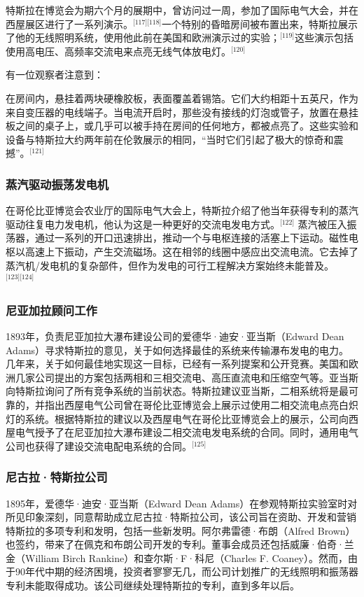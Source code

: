 特斯拉在博览会为期六个月的展期中，曾访问过一周，参加了国际电气大会，并在西屋展区进行了一系列演示。\(^\text{[117][118]}\)一个特别的昏暗房间被布置出来，特斯拉展示了他的无线照明系统，使用他此前在美国和欧洲演示过的实验；\(^\text{[119]}\)这些演示包括使用高电压、高频率交流电来点亮无线气体放电灯。\(^\text{[120]}\)

有一位观察者注意到：

在房间内，悬挂着两块硬橡胶板，表面覆盖着锡箔。它们大约相距十五英尺，作为来自变压器的电线端子。当电流开启时，那些没有接线的灯泡或管子，放置在悬挂板之间的桌子上，或几乎可以被手持在房间的任何地方，都被点亮了。这些实验和设备与特斯拉大约两年前在伦敦展示的相同，“当时它们引起了极大的惊奇和震撼”。\(^\text{[121]}\)
\subsubsection{蒸汽驱动振荡发电机}  
在哥伦比亚博览会农业厅的国际电气大会上，特斯拉介绍了他当年获得专利的蒸汽驱动往复电力发电机，他认为这是一种更好的交流电发电方式。\(^\text{[122]}\) 蒸汽被压入振荡器，通过一系列的开口迅速排出，推动一个与电枢连接的活塞上下运动。磁性电枢以高速上下振动，产生交流磁场。这在相邻的线圈中感应出交流电流。它去掉了蒸汽机/发电机的复杂部件，但作为发电的可行工程解决方案始终未能普及。\(^\text{[123][124]}\)
\subsubsection{尼亚加拉顾问工作}  
1893年，负责尼亚加拉大瀑布建设公司的爱德华·迪安·亚当斯（Edward Dean Adams）寻求特斯拉的意见，关于如何选择最佳的系统来传输瀑布发电的电力。几年来，关于如何最佳地实现这一目标，已经有一系列提案和公开竞赛。美国和欧洲几家公司提出的方案包括两相和三相交流电、高压直流电和压缩空气等。亚当斯向特斯拉询问了所有竞争系统的当前状态。特斯拉建议亚当斯，二相系统将是最可靠的，并指出西屋电气公司曾在哥伦比亚博览会上展示过使用二相交流电点亮白炽灯的系统。根据特斯拉的建议以及西屋电气在哥伦比亚博览会上的展示，公司向西屋电气授予了在尼亚加拉大瀑布建设二相交流电发电系统的合同。同时，通用电气公司也获得了建设交流电配电系统的合同。\(^\text{[125]}\)
\subsubsection{尼古拉·特斯拉公司} 
1895年，爱德华·迪安·亚当斯（Edward Dean Adams）在参观特斯拉实验室时对所见印象深刻，同意帮助成立尼古拉·特斯拉公司，该公司旨在资助、开发和营销特斯拉的多项专利和发明，包括一些新发明。阿尔弗雷德·布朗（Alfred Brown）也签约，带来了在佩克和布朗公司开发的专利。董事会成员还包括威廉·伯奇·兰金（William Birch Rankine）和查尔斯·F·科尼（Charles F. Coaney）。然而，由于90年代中期的经济困境，投资者寥寥无几，而公司计划推广的无线照明和振荡器专利未能取得成功。该公司继续处理特斯拉的专利，直到多年以后。

